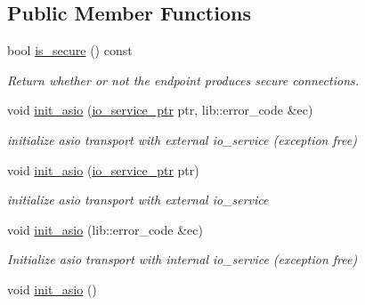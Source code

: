 \subsection*{Public Member Functions}
\begin{DoxyCompactItemize}
\item 
bool \hyperlink{classwebsocketpp_1_1transport_1_1asio_1_1endpoint_a31d10fbfbc4bc7693c5f1679bc35516f}{is\+\_\+secure} () const\hypertarget{classwebsocketpp_1_1transport_1_1asio_1_1endpoint_a31d10fbfbc4bc7693c5f1679bc35516f}{}\label{classwebsocketpp_1_1transport_1_1asio_1_1endpoint_a31d10fbfbc4bc7693c5f1679bc35516f}

\begin{DoxyCompactList}\small\item\em Return whether or not the endpoint produces secure connections. \end{DoxyCompactList}\item 
void \hyperlink{classwebsocketpp_1_1transport_1_1asio_1_1endpoint_a67da637106d3cfb40078b477e2579a13}{init\+\_\+asio} (\hyperlink{classwebsocketpp_1_1transport_1_1asio_1_1endpoint_ae97c65823630f00c2418578012cb7788}{io\+\_\+service\+\_\+ptr} ptr, lib\+::error\+\_\+code \&ec)
\begin{DoxyCompactList}\small\item\em initialize asio transport with external io\+\_\+service (exception free) \end{DoxyCompactList}\item 
void \hyperlink{classwebsocketpp_1_1transport_1_1asio_1_1endpoint_a320fc4ea3a151afaf8b973ce32effd25}{init\+\_\+asio} (\hyperlink{classwebsocketpp_1_1transport_1_1asio_1_1endpoint_ae97c65823630f00c2418578012cb7788}{io\+\_\+service\+\_\+ptr} ptr)
\begin{DoxyCompactList}\small\item\em initialize asio transport with external io\+\_\+service \end{DoxyCompactList}\item 
void \hyperlink{classwebsocketpp_1_1transport_1_1asio_1_1endpoint_a7b4249fd3e2663323ac29ef7935278de}{init\+\_\+asio} (lib\+::error\+\_\+code \&ec)
\begin{DoxyCompactList}\small\item\em Initialize asio transport with internal io\+\_\+service (exception free) \end{DoxyCompactList}\item 
void \hyperlink{classwebsocketpp_1_1transport_1_1asio_1_1endpoint_a22938eec899a9ab2b9ada2b76172f798}{init\+\_\+asio} ()

\end{DoxyCompactItemize}
